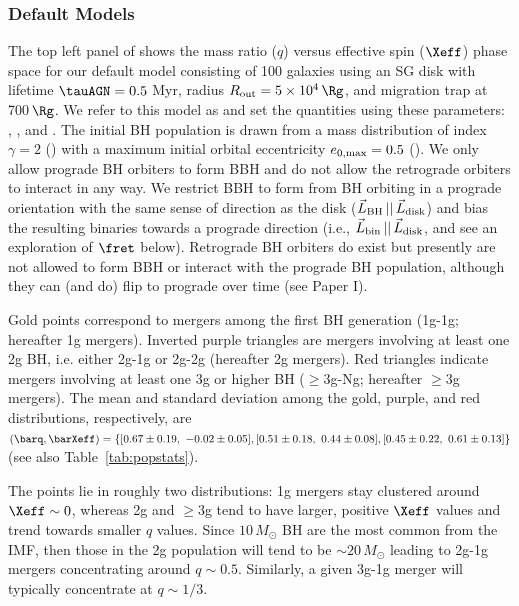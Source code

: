 \subsubsection{Default Models}
The top left panel of  shows the mass ratio ($q$) versus effective spin ($\Xeff$) phase space for our default model consisting of 100 galaxies using an SG disk with lifetime $\tauAGN = 0.5$ Myr, radius $R_{\rm out} = 5\times 10^4\,\Rg$, and migration trap at 700$\,\Rg$.
We refer to this model as  and set the quantities using these  parameters: , , and .
The initial BH population is drawn from a mass distribution of index $\gamma=2$ () with a maximum initial orbital eccentricity $e_{\rm 0,max}=0.5$ ().
We only allow prograde BH orbiters to form BBH and do not allow the retrograde orbiters to interact in any way.
We restrict BBH to form from BH orbiting in a prograde orientation with the same sense of direction as the disk ($\vec{L}_{\rm BH}\,||\,\vec{L}_{\rm disk}$) and bias the resulting binaries towards a prograde direction (i.e., $\vec{L}_{\rm bin}\,||\,\vec{L}_{\rm disk}$, and see an exploration of $\fret$ below).
Retrograde BH orbiters do exist but presently are not allowed to form BBH or interact with the prograde BH population, although they can (and do) flip to prograde over time (see Paper I).

Gold points correspond to mergers among the first BH generation (1g-1g; hereafter 1g mergers).
Inverted purple triangles are mergers involving at least one 2g BH, i.e. either 2g-1g or 2g-2g (hereafter 2g mergers).
Red triangles indicate mergers involving at least one 3g or higher BH ($\geq$3g-Ng; hereafter $\geq$3g mergers).
The mean and standard deviation among the gold, purple, and red distributions, respectively, are $(\barq,\barXeff)=\{[0.67\pm 0.19,\ -0.02\pm 0.05], [0.51\pm 0.18,\ 0.44\pm 0.08], [0.45\pm 0.22,\ 0.61\pm 0.13]\}$ (see also Table~\ref{tab:popstats}).

The points lie in roughly two distributions: 1g mergers stay clustered around $\Xeff \sim 0$, whereas 2g and $\geq$3g tend to have larger, positive $\Xeff$ values and trend towards smaller $q$ values.
Since $10\,M_{\odot}$ BH are the most common from the IMF, then those in the 2g population will tend to be $\sim 20\,M_{\odot}$ leading to 2g-1g mergers concentrating around $q \sim 0.5$.
Similarly, a given 3g-1g merger will typically concentrate at $q \sim 1/3$.

